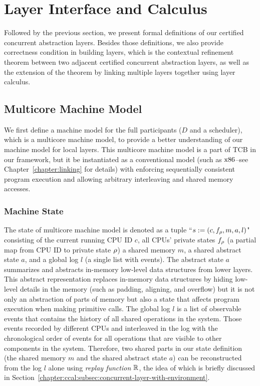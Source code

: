 \section{Layer Interface and Calculus}
\label{chapter:ccal:sec:interface-calculus}

Followed by the previous section, 
we present formal definitions of our certified concurrent abstraction layers.
Besides those definitions, 
we also provide correctness condition in building layers, which is 
the contextual refinement theorem between two adjacent certified concurrent abstraction layers,
as well as the extension of the theorem by linking multiple layers together using layer calculus.


\subsection{Multicore Machine Model}
\label{chapter:ccal:subsec:multicore-machine-model}


We first define a machine model for the full participants ($D$ and  a scheduler), which is a multicore machine model, 
to provide a better understanding of our machine model for local layers.
This multicore machine model is a part of TCB in our framework, but it be instantiated as a conventional model (such as $\mathrm{x86}$--see Chapter~\ref{chapter:linking} for  details) with enforcing sequentially consistent program
execution and allowing arbitrary interleaving
and shared memory accesses. 


\subsubsection{Machine State} 
The state of  multicore machine model is denoted as a tuple ``$s := (c, f_{\rho}, m, a, l)$"
consisting of
 the current running CPU ID $c$,
all CPUs' private states $f_\rho$ (a partial map from CPU ID to  private state $\rho$)
 a shared memory $m$,
 a shared abstract state $a$,
and  a global log $l$ (a single list with events).
The abstract state $a$ 
summarizes and abstracts in-memory low-level data structures from lower layers. 
This abstract representation replaces
in-memory data structures by hiding low-level details in the memory (such as padding, aligning, and overflow)
but it is not only an abstraction of parts of memory but also a state that affects program execution when making primitive calls. 
The global log $l$ is a list of observable events that contains the history of all shared operations in the system.
Those events recorded by different CPUs and
interleaved in the log with  the chronological order of events for all operations that are visible to other components in the system. 
Therefore, 
two shared parts in our state definition (the shared memory $m$  
and the shared abstract state $a$)
can be reconstructed
from the log $l$ alone  using \emph{replay function} $\mathbb{R}$,
the idea of which is briefly discussed in Section~\ref{chapter:ccal:subsec:concurrent-layer-with-environment}.


